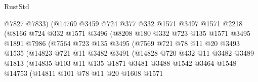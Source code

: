 \begin{lexlean}{RustStd}
\begin{coremodule}
{{                          @7827
                          @7833)
                        (@14769
                          @3459
                          @724
                          @377
                          @332
                          @1571
                          @3497
                          @1571
                          @2218
                          (@8166
                            @724
                            @332
                            @1571
                            @3496
                            (@8208
                              @180
                              @332
                              @723
                              @135
                              @1571
                              @3495
                              @1891
                              @7986
                              (@7564
                                @723
                                @135
                                @3495
                                (@7569
                                  @721
                                  @78
                                  @11
                                  @20
                                  @3493
                                  @1535
                                  (@14823
                                    @721
                                    @11
                                    @3482
                                    @3491
                                    (@14828
                                      @720
                                      @432
                                      @11
                                      @3482
                                      @3489
                                      @1813
                                      (@14835
                                        @103
                                        @11
                                        @135
                                        @1871
                                        @3481
                                        @3488
                                        @1542
                                        @3464
                                        @1548
                                        @14753
                                        (@14811
                                          @101
                                          @78
                                          @11
                                          @20
                                          @1608
                                          @1571
}}
\end{coremodule}
\end{lexlean}
